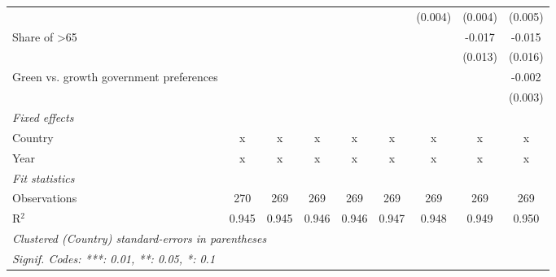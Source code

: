 \begin{table}[htbp]
\begin{tabular}{lcccccccc}
                                                &         &         &         &         &         & (0.004) & (0.004)      & (0.005)\\   
      Share of >65                              &         &         &         &         &         &         & -0.017       & -0.015\\   
                                                &         &         &         &         &         &         & (0.013)      & (0.016)\\   
      Green vs. growth government preferences   &         &         &         &         &         &         &              & -0.002\\   
                                                &         &         &         &         &         &         &              & (0.003)\\   
      \emph{Fixed effects}\\
      Country                                   & x       & x       & x       & x       & x       & x       & x            & x\\  
      Year                                      & x       & x       & x       & x       & x       & x       & x            & x\\  
      \midrule \emph{Fit statistics}\\
      Observations                              & 270     & 269     & 269     & 269     & 269     & 269     & 269          & 269\\  
      R$^2$                                     & 0.945   & 0.945   & 0.946   & 0.946   & 0.947   & 0.948   & 0.949        & 0.950\\  
      \midrule
      \multicolumn{9}{l}{\emph{Clustered (Country) standard-errors in parentheses}}\\
      \multicolumn{9}{l}{\emph{Signif. Codes: ***: 0.01, **: 0.05, *: 0.1}}\\
   \end{tabular}
\end{table}


